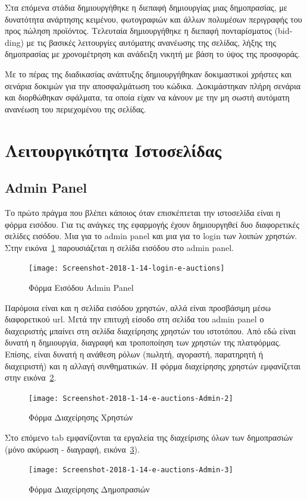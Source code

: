 \documentclass[12pt]{report}
\begin{document}
Στα επόμενα στάδια δημιουργήθηκε η διεπαφή δημιουργίας μιας δημοπρασίας, με δυνατότητα ανάρτησης κειμένου, φωτογραφιών και άλλων πολυμέσων περιγραφής του προς πώληση προϊόντος. Τελευταία δημιουργήθηκε η διεπαφή πονταρίσματος (\textlatin{bidding}) με τις βασικές λειτουργίες αυτόματης ανανέωσης της σελίδας, λήξης της δημοπρασίας με χρονομέτρηση και ανάδειξη νικητή με βάση το ύψος της προσφοράς.

Με το πέρας της διαδικασίας ανάπτυξης δημιουργήθηκαν δοκιμαστικοί χρήστες και σενάρια δοκιμών για την αποσφαλμάτωση του κώδικα. Δοκιμάστηκαν πλήρη σενάρια και διορθώθηκαν σφάλματα, τα οποία είχαν να κάνουν με την μη σωστή αυτόματη ανανέωση του περιεχομένου της σελίδας.

\section{Λειτουργικότητα Ιστοσελίδας}
\subsection{\textlatin{Admin Panel}}
Το πρώτο πράγμα που βλέπει κάποιος όταν επισκέπτεται την ιστοσελίδα είναι η φόρμα εισόδου. Για τις ανάγκες της εφαρμογής έχουν δημιουργηθεί δυο διαφορετικές σελίδες εισόδου. Μια για το \textlatin{admin panel} και μια για το \textlatin{login} των λοιπών χρηστών. Στην εικόνα~\ref{fig:login_1} παρουσιάζεται η σελίδα εισόδου στο \textlatin{admin panel}.
\begin{figure}[H]
\centering
\texttt{[image: Screenshot-2018-1-14-login-e-auctions]}
\caption{Φόρμα Εισόδου \textlatin{Admin Panel}}
\label{fig:login_1}
\end{figure}

Παρόμοια είναι και η σελίδα εισόδου χρηστών, αλλά είναι προσβάσιμη μέσω διαφορετικού \textlatin{url}. Μετά την επιτυχή είσοδο στη σελίδα του \textlatin{admin panel} ο διαχειριστής μπαίνει στη σελίδα διαχείρησης χρηστών του ιστοτόπου. Από εδώ είναι δυνατή η δημιουργία, διαγραφή και τροποποίηση των χρηστών της πλατφόρμας. Επίσης, είναι δυνατή η ανάθεση ρόλων (πωλητή, αγοραστή, παρατηρητή ή διαχειριστή) και η αλλαγή συνθηματικών. Η φόρμα διαχείρησης χρηστών εμφανίζεται στην εικόνα~\ref{fig:user_admin}.
\begin{figure}[H]
\centering
\texttt{[image: Screenshot-2018-1-14-e-auctions-Admin-2]}
\caption{Φόρμα Διαχείρησης Χρηστών}
\label{fig:user_admin}
\end{figure}

Στο επόμενο \textlatin{tab} εμφανίζονται τα εργαλεία της διαχείρισης όλων των δημοπρασιών (μόνο ακύρωση - διαγραφή, εικόνα~\ref{fig:auction_admin}).
\begin{figure}[H]
\centering
\texttt{[image: Screenshot-2018-1-14-e-auctions-Admin-3]}
\caption{Φόρμα Διαχείρησης Δημοπρασιών}
\label{fig:auction_admin}
\end{figure}
\end{document}
